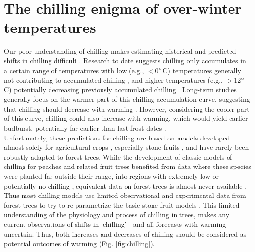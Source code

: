 \documentclass[11pt]{article}
\begin{document}
\section{The chilling enigma of over-winter temperatures}
Our poor understanding of chilling makes estimating historical and predicted shifts in chilling difficult \citep{chuine2016}. Research to date suggests chilling only accumulates in a certain range of temperatures with low (e.g., $<$0$\degree$C) temperatures generally not contributing to accumulated chilling \citep[but see][]{baum2021}, and higher temperatures (e.g., $>$12$\degree$C) potentially decreasing previously accumulated chilling \citep[see Fig. \ref{fig:chilling} and][]{richardson1974,fishman1987}. Long-term studies generally focus on the warmer part of this chilling accumulation curve, suggesting that chilling should decrease with warming \citep{fu2015,piao2017,gauzere2019}.  However, considering the cooler part of this curve, chilling could also increase with warming, which would yield earlier budburst, potentially far earlier than last frost dates \citep[][]{guy2014}. \\

Unfortunately, these predictions for chilling are based on models developed almost solely for agricultural crops \citep[but see][]{harrington2015}, especially stone fruits \citep[even for stone fruits, there have been few advances on the possible mechanisms and pathways that underlie these models over decades of research, see][]{erez1971,Rageau}, and have rarely been robustly adapted to forest trees. While the development of classic models of chilling for peaches and related fruit trees benefited from data where these species were planted far outside their range, into regions with extremely low or potentially no chilling \citep{erez1971,richardson1974}, equivalent data on forest trees is almost never available \citep{dennis2003}. Thus most chilling models use limited observational and experimental data from forest trees to try to re-parametrize the basic stone fruit models \citep{Chuine2000,chuine2016}. This limited understanding of the physiology and process of chilling in trees, makes any current observations of shifts in `chilling'---and all forecasts with warming---uncertain. Thus, both increases and decreases of chilling should be considered as potential outcomes of warming (Fig. \ref{fig:chilling}). \\
\end{document}
